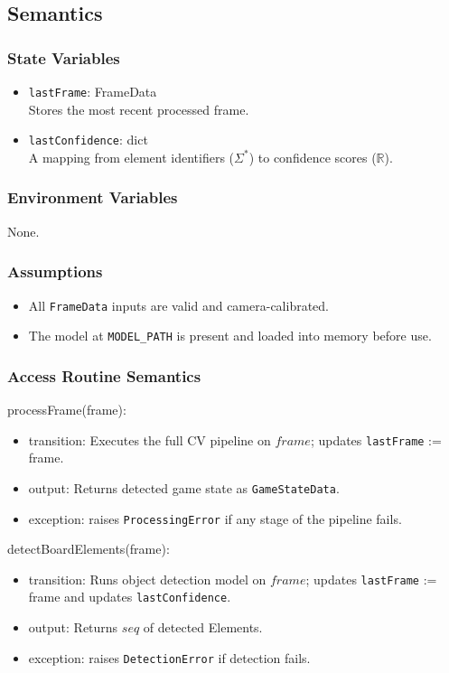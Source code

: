\documentclass[12pt, titlepage]{article}
\begin{document}
\subsection{Semantics}

\subsubsection{State Variables}
\begin{itemize}
\item \texttt{lastFrame}: FrameData \\
      Stores the most recent processed frame.
\item \texttt{lastConfidence}: dict \\
      A mapping from element identifiers ($\Sigma^{*}$) to confidence scores ($\mathbb{R}$).
\end{itemize}

\subsubsection{Environment Variables}
None.

\subsubsection{Assumptions}
\begin{itemize}
    \item All \texttt{FrameData} inputs are valid and camera-calibrated.
    \item The model at \texttt{MODEL\_PATH} is present and loaded into memory before use.
\end{itemize}

\subsubsection{Access Routine Semantics}

\noindent processFrame(frame):
\begin{itemize}
\item transition: Executes the full CV pipeline on $frame$;  
      updates \texttt{lastFrame} := frame.
\item output: Returns detected game state as \texttt{GameStateData}.
\item exception: raises \texttt{ProcessingError} if any stage of the pipeline fails.
\end{itemize}

\noindent detectBoardElements(frame):
\begin{itemize}
\item transition: Runs object detection model on $frame$;  
      updates \texttt{lastFrame} := frame and updates \texttt{lastConfidence}.
\item output: Returns $seq$ of detected Elements.
\item exception: raises \texttt{DetectionError} if detection fails.
\end{itemize}
\end{document}
